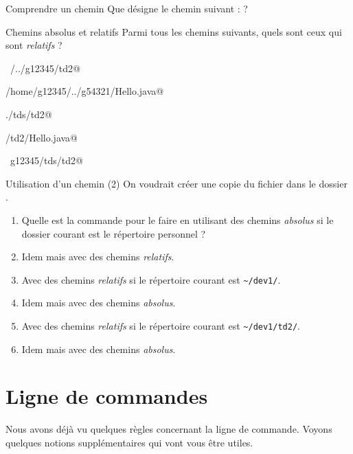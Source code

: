 \documentclass[a4paper,11pt]{style-esi/td}
\begin{document}
		\begin{Exercice}{Comprendre un chemin}
			Que désigne le chemin suivant :
			 ?
		\end{Exercice}

		\begin{Exercice}{Chemins absolus et relatifs}
			Parmi tous les chemins suivants, quels sont ceux qui sont 
			\emph{relatifs} ?			
			\begin{selectmany} 
			\item \verb@~/../g12345/td2@
			\item \verb@/home/g12345/../g54321/Hello.java@
			\item \verb@./tds/td2@
			\item \verb@tds/td2/Hello.java@
			\item \verb@~g12345/tds/td2@
			\end{selectmany} 
        \end{Exercice}

		\begin{Exercice}{Utilisation d'un chemin (2)}
			On voudrait créer une copie du fichier 
			dans le dossier .
			\begin{enumerate}
			\item 
				Quelle est la commande pour le faire en utilisant
				des chemins \emph{absolus} si le dossier courant
				est le répertoire personnel ?
				\textbox{2em}
			\item 
				Idem mais avec des chemins \emph{relatifs}.
				\textbox{2em}
			\item 
				Avec des chemins \emph{relatifs}
				si le répertoire courant est \verb|~/dev1/|.
				\textbox{2em}
			\item 
				Idem mais avec des chemins \emph{absolus}.
				\textbox{2em}
			\item 
				Avec des chemins \emph{relatifs}
				si le répertoire courant est \verb|~/dev1/td2/|.
				\textbox{2em}
			\item 
				Idem mais avec des chemins \emph{absolus}.
				\textbox{2em}
		\end{enumerate}
		\end{Exercice}

\section{Ligne de commandes}

	Nous avons déjà vu quelques règles concernant la ligne de commande.
	Voyons quelques notions supplémentaires qui vont vous être utiles.
\end{document}
